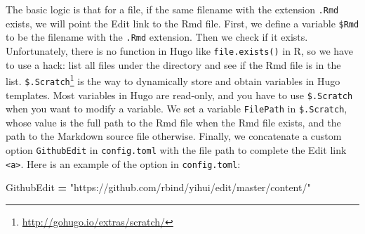 \documentclass[12pt,]{krantz}
\makeatletter
\newenvironment{Shaded}{\begin{snugshade}}{\end{snugshade}}
\newcommand{\KeywordTok}[1]{\textcolor[rgb]{0.13,0.29,0.53}{\textbf{#1}}}
\newcommand{\StringTok}[1]{\textcolor[rgb]{0.31,0.60,0.02}{#1}}
\newcommand{\OtherTok}[1]{\textcolor[rgb]{0.56,0.35,0.01}{#1}}
\newcommand{\OperatorTok}[1]{\textcolor[rgb]{0.81,0.36,0.00}{\textbf{#1}}}
\newcommand{\NormalTok}[1]{#1}
\renewcommand{\href}[2]{#2\footnote{\url{#1}}}
\newenvironment{kframe}{%
\medskip{}
\setlength{\fboxsep}{.8em}
 \def\at@end@of@kframe{}%
 \ifinner\ifhmode%
  \def\at@end@of@kframe{\end{minipage}}%
  \begin{minipage}{\columnwidth}%
 \fi\fi%
 \def\FrameCommand##1{\hskip\@totalleftmargin \hskip-\fboxsep
 \colorbox{shadecolor}{##1}\hskip-\fboxsep
     \hskip-\linewidth \hskip-\@totalleftmargin \hskip\columnwidth}%
 \MakeFramed {\advance\hsize-\width
   \@totalleftmargin\z@ \linewidth\hsize
   \@setminipage}}%
 {\par\unskip\endMakeFramed%
 \at@end@of@kframe}
\renewenvironment{Shaded}{\begin{kframe}}{\end{kframe}}
\theoremstyle{definition}
\theoremstyle{definition}
\theoremstyle{definition}
\theoremstyle{remark}
\makeatother
\begin{document}
\begin{itemize}
\begin{Shaded}
\end{Shaded}

  The basic logic is that for a file, if the same filename with the
  extension \texttt{.Rmd} exists, we will point the Edit link to the Rmd
  file. First, we define a variable \texttt{\$Rmd} to be the filename
  with the \texttt{.Rmd} extension. Then we check if it exists.
  Unfortunately, there is no function in Hugo like
  \texttt{file.exists()} in R, so we have to use a hack: list all files
  under the directory and see if the Rmd file is in the list.
  \href{http://gohugo.io/extras/scratch/}{\texttt{\$.Scratch}} is the
  way to dynamically store and obtain variables in Hugo templates. Most
  variables in Hugo are read-only, and you have to use
  \texttt{\$.Scratch} when you want to modify a variable. We set a
  variable \texttt{FilePath} in \texttt{\$.Scratch}, whose value is the
  full path to the Rmd file when the Rmd file exists, and the path to
  the Markdown source file otherwise. Finally, we concatenate a custom
  option \texttt{GithubEdit} in \texttt{config.toml} with the file path
  to complete the Edit link \texttt{\textless{}a\textgreater{}}. Here is
  an example of the option in \texttt{config.toml}:

\begin{Shaded}
\begin{Highlighting}[]
\NormalTok{[params]}
\NormalTok{  GithubEdit }\OperatorTok{=} \StringTok{"https://github.com/rbind/yihui/edit/master/content/"}
\end{Highlighting}
\end{Shaded}


\end{itemize}
\end{document}
